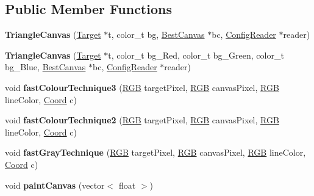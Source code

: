 \subsection*{Public Member Functions}
\begin{DoxyCompactItemize}
\item 
\hypertarget{classTriangleCanvas_a553cd4675433a3332061d67f1b7f1fb6}{}\label{classTriangleCanvas_a553cd4675433a3332061d67f1b7f1fb6} 
{\bfseries Triangle\+Canvas} (\hyperlink{classTarget}{Target} $\ast$t, color\+\_\+t bg, \hyperlink{classBestCanvas}{Best\+Canvas} $\ast$bc, \hyperlink{classConfigReader}{Config\+Reader} $\ast$reader)
\item 
\hypertarget{classTriangleCanvas_a5a1ec0f78cdc22d981ea313e18fc159d}{}\label{classTriangleCanvas_a5a1ec0f78cdc22d981ea313e18fc159d} 
{\bfseries Triangle\+Canvas} (\hyperlink{classTarget}{Target} $\ast$t, color\+\_\+t bg\+\_\+\+Red, color\+\_\+t bg\+\_\+\+Green, color\+\_\+t bg\+\_\+\+Blue, \hyperlink{classBestCanvas}{Best\+Canvas} $\ast$bc, \hyperlink{classConfigReader}{Config\+Reader} $\ast$reader)
\item 
\hypertarget{classTriangleCanvas_a48a53c4f4e1d78afb421b0664ad00f71}{}\label{classTriangleCanvas_a48a53c4f4e1d78afb421b0664ad00f71} 
void {\bfseries fast\+Colour\+Technique3} (\hyperlink{structRGB}{R\+GB} target\+Pixel, \hyperlink{structRGB}{R\+GB} canvas\+Pixel, \hyperlink{structRGB}{R\+GB} line\+Color, \hyperlink{structCoord}{Coord} c)
\item 
\hypertarget{classTriangleCanvas_a7c3ea161602554838570ffda476f41c2}{}\label{classTriangleCanvas_a7c3ea161602554838570ffda476f41c2} 
void {\bfseries fast\+Colour\+Technique2} (\hyperlink{structRGB}{R\+GB} target\+Pixel, \hyperlink{structRGB}{R\+GB} canvas\+Pixel, \hyperlink{structRGB}{R\+GB} line\+Color, \hyperlink{structCoord}{Coord} c)
\item 
\hypertarget{classTriangleCanvas_ac82a5102dc99f329159e1d52bb849a35}{}\label{classTriangleCanvas_ac82a5102dc99f329159e1d52bb849a35} 
void {\bfseries fast\+Gray\+Technique} (\hyperlink{structRGB}{R\+GB} target\+Pixel, \hyperlink{structRGB}{R\+GB} canvas\+Pixel, \hyperlink{structRGB}{R\+GB} line\+Color, \hyperlink{structCoord}{Coord} c)
\item 
\hypertarget{classTriangleCanvas_a7904b9dacf60e46dd050843600dac94a}{}\label{classTriangleCanvas_a7904b9dacf60e46dd050843600dac94a} 
void {\bfseries paint\+Canvas} (vector$<$ float $>$)
\item 
\hypertarget{classTriangleCanvas_ae56a21198d74906bab219124a1fc6597}{}\label{classTriangleCanvas_ae56a21198d74906bab219124a1fc6597} 

\end{DoxyCompactItemize}
